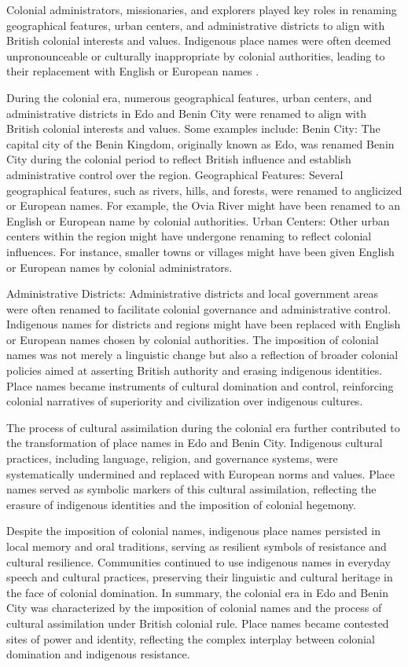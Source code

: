 Colonial administrators, missionaries, and explorers played key roles in renaming geographical features, urban centers, and administrative districts to align with British colonial interests and values. Indigenous place names were often deemed unpronounceable or culturally inappropriate by colonial authorities, leading to their replacement with English or European names \cite{Charles2007}.

During the colonial era, numerous geographical features, urban centers, and administrative districts in Edo and Benin City were renamed to align with British colonial interests and values. Some examples include:
Benin City: The capital city of the Benin Kingdom, originally known as Edo, was renamed Benin City during the colonial period to reflect British influence and establish administrative control over the region.
Geographical Features: Several geographical features, such as rivers, hills, and forests, were renamed to anglicized or European names. For example, the Ovia River might have been renamed to an English or European name by colonial authorities.
Urban Centers: Other urban centers within the region might have undergone renaming to reflect colonial influences. For instance, smaller towns or villages might have been given English or European names by colonial administrators.

Administrative Districts: Administrative districts and local government areas were often renamed to facilitate colonial governance and administrative control. Indigenous names for districts and regions might have been replaced with English or European names chosen by colonial authorities.
The imposition of colonial names was not merely a linguistic change but also a reflection of broader colonial policies aimed at asserting British authority and erasing indigenous identities. Place names became instruments of cultural domination and control, reinforcing colonial narratives of superiority and civilization over indigenous cultures\cite{Charles2007}.

The process of cultural assimilation during the colonial era further contributed to the transformation of place names in Edo and Benin City. Indigenous cultural practices, including language, religion, and governance systems, were systematically undermined and replaced with European norms and values. Place names served as symbolic markers of this cultural assimilation, reflecting the erasure of indigenous identities and the imposition of colonial hegemony.

Despite the imposition of colonial names, indigenous place names persisted in local memory and oral traditions, serving as resilient symbols of resistance and cultural resilience. Communities continued to use indigenous names in everyday speech and cultural practices, preserving their linguistic and cultural heritage in the face of colonial domination\cite{Charles2007}.
In summary, the colonial era in Edo and Benin City was characterized by the imposition of colonial names and the process of cultural assimilation under British colonial rule. Place names became contested sites of power and identity, reflecting the complex interplay between colonial domination and indigenous resistance.
